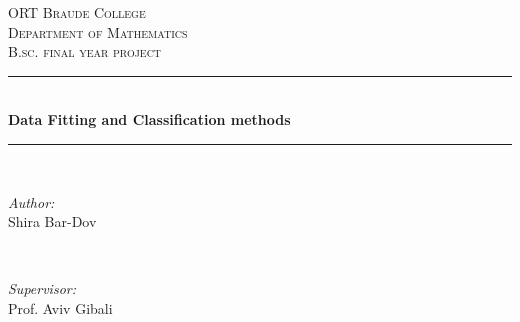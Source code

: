 \documentclass[12pt]{article}
\begin{document}

\begin{titlepage}

\newcommand{\HRule}{\rule{\linewidth}{0.5mm}} %



\textsc{\LARGE ORT Braude College}\\[1.5cm] %
\textsc{\LARGE Department of Mathematics}\\[0.5cm] %
\textsc{\LARGE B.sc. final year project}\\[0.5cm] %


\HRule \\[0.4cm]
{ \huge \bfseries Data Fitting and Classification methods }\\[0.4cm] %
\HRule \\[1.5cm]


\begin{minipage}{0.4\textwidth}
\begin{flushleft} \large
\emph{Author:}\\
Shira Bar-Dov %
\end{flushleft}
\end{minipage}
~
\begin{minipage}{0.4\textwidth}
\begin{flushright} \large
\emph{Supervisor:} \\
Prof. Aviv Gibali  %
\end{flushright}
\end{minipage}\\[2cm]


\end{titlepage}
\end{document}
